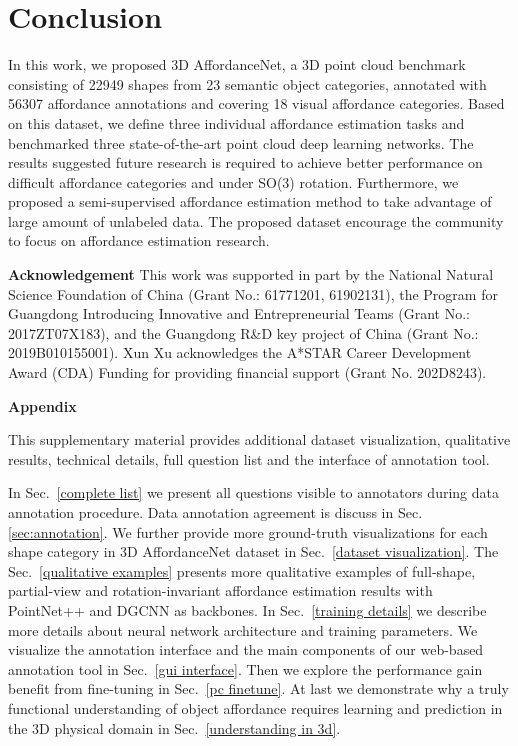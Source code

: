\documentclass[final]{cvpr}
\begin{document}
\section{Conclusion}

In this work, we proposed 3D AffordanceNet, a 3D point cloud benchmark consisting of 22949 shapes from 23 semantic object categories, annotated with 56307 affordance annotations and covering 18 visual affordance categories. Based on this dataset, we define three individual affordance estimation tasks and benchmarked three state-of-the-art point cloud deep learning networks. The results suggested future research is required to achieve better performance on difficult affordance categories and under SO(3) rotation. Furthermore, we proposed a semi-supervised affordance estimation method to take advantage of large amount of unlabeled data. The proposed dataset encourage the community to focus on affordance estimation research.

\noindent\textbf{Acknowledgement} This work was supported in part by the National Natural Science Foundation of China (Grant No.: 61771201, 61902131), the Program for Guangdong Introducing Innovative and Entrepreneurial Teams (Grant No.: 2017ZT07X183), and the Guangdong R\&D key project of China (Grant No.: 2019B010155001). Xun Xu acknowledges the A*STAR Career Development Award (CDA) Funding for providing financial support (Grant No. 202D8243).
{\small


}

\clearpage
\textbf{\Large Appendix} \\
\appendix

This supplementary material provides additional dataset visualization, qualitative results, technical details, full question list and the interface of annotation tool.

In Sec.~\ref{complete list} we present all questions visible to annotators during data annotation procedure. Data annotation agreement is discuss in Sec.\ref{sec:annotation}. We further provide more ground-truth visualizations for each shape category in 3D AffordanceNet dataset in Sec.~\ref{dataset visualization}. The Sec.~\ref{qualitative examples} presents more qualitative examples of full-shape, partial-view and rotation-invariant affordance estimation results with PointNet++ and DGCNN as backbones. In Sec.~\ref{training details} we describe more details about neural network architecture and training parameters.  We visualize the annotation interface and the main components of our web-based annotation tool in Sec.~\ref{gui interface}. Then we explore the performance gain benefit from fine-tuning in Sec.~\ref{pc finetune}. At last we demonstrate why a truly functional understanding of object affordance requires learning and prediction in the 3D physical domain in Sec.~\ref{understanding in 3d}.
\end{document}
